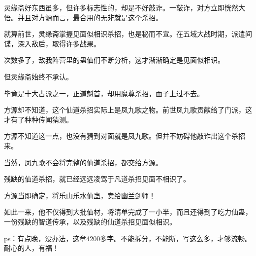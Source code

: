 \begin{this_body}
灵缘斋好东西虽多，但许多标志性的，却是不好敲诈。一敲诈，对方立即恍然大悟。并且对方源而言，最合用的无非就是这个杀招。

就算前世，灵缘斋掌握见面似相识杀招，也是秘而不宣。在五域大战时期，派遣间谍，深入敌后，取得许多战果。

次数多了，敌我阵营里的蛊仙们不断分析，这才渐渐确定是见面似相识。

但灵缘斋始终不承认。

毕竟是十大古派之一，正道魁首，却用魔尊杀招，面子上过不去。

方源却不知道，这个仙道杀招实际上是凤九歌之物。前世凤九歌贡献给了门派，这才有了种种传闻猜测。

方源不知道这一点，也没有猜到对面就是凤九歌。但并不妨碍他敲诈出这个杀招来。

当然，凤九歌不会将完整的仙道杀招，都交给方源。

残缺的仙道杀招，就已经远远凌驾于凡道杀招见面不相识了。

方源当即确定，将乐山乐水仙蛊，卖给幽兰剑师！

如此一来，他不仅得到大批仙材，将清单完成了一小半，而且还得到了吃力仙蛊，一份残缺的智道传承，以及残缺的仙道杀招见面似相识。

ps：有点晚，没办法，这章4200多字。不能拆分，不能断，写这么多，才够流畅。耐心的人，有福！

\end{this_body}

